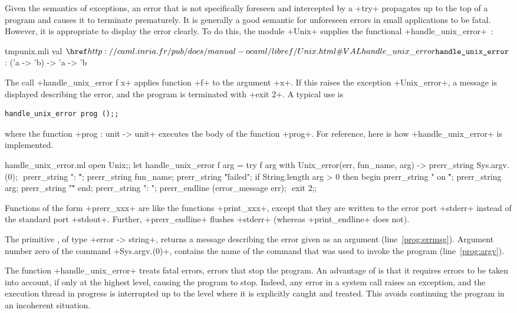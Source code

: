 Given the semantics of exceptions, an error that is not specifically
foreseen and intercepted by a \ml+try+ propagates up to the top of a
program and causes it to terminate prematurely.  It is generally a
good semantic for unforeseen errors in small applications to be
fatal. However, it is appropriate to display the error clearly. To do
this, the module \ml+Unix+ supplies the functional
\ml+handle_unix_error+~:
%
\begin{listingcodefile}{tmpunix.mli}
val $\indexlibvalue{Unix}{handle\_unix\_error}$ : ('a -> 'b) -> 'a -> 'b
\end{listingcodefile}
%
The call  \ml+handle_unix_error f x+ applies function  \ml+f+ to the
argument \ml+x+. If this raises the exception \ml+Unix_error+, a
message is displayed describing the error, and the program is
terminated with  \ml+exit 2+. A typical use is
%
\begin{lstlisting}
handle_unix_error prog ();;
\end{lstlisting}
%
where the function  \ml+prog : unit -> unit+  executes the body of the
function  \ml+prog+. For reference, here is how
\ml+handle_unix_error+ is implemented.
%
\begin{listingcodefile}[style=numbers]{handle_unix_error.ml}
open Unix;;
let handle_unix_error f arg =
  try
    f arg
  with Unix_error(err, fun_name, arg) ->
    prerr_string Sys.argv.(0); $\label{prog:argv}$
    prerr_string ": \"";
    prerr_string fun_name;
    prerr_string "\" failed";
    if String.length arg > 0 then begin
      prerr_string " on \"";
      prerr_string arg;
      prerr_string "\""
    end;
    prerr_string ": ";
    prerr_endline (error_message err); $\label{prog:errmsg}$
    exit 2;;
\end{listingcodefile}
%
Functions of the form \ml+prerr_xxx+ are like the functions
\ml+print_xxx+, except that they are written to the error port
\ml+stderr+ instead of the standard port \ml+stdout+. Further,
\ml+prerr_endline+ flushes \ml+stderr+ (whereas \ml+print_endline+ does not).

The primitive , of type 
\ml+error -> string+, returns a message describing the error given as an argument
(line~\ref{prog:errmsg}). Argument number zero of the command
\ml+Sys.argv.(0)+, contains the name of the command that was used to
invoke the program (line~\ref{prog:argv}).

The function \ml+handle_unix_error+ treats fatal errors, \ie{} errors
that stop the program.  An advantage of {\ocaml} is that it requires
errors to be taken into account, if only at the highest level, causing
the program to stop. Indeed, any error in a system call raises an
exception, and the execution thread in progress is interrupted up to the
level where it is explicitly caught and treated. This avoids
continuing the program in an incoherent situation.

